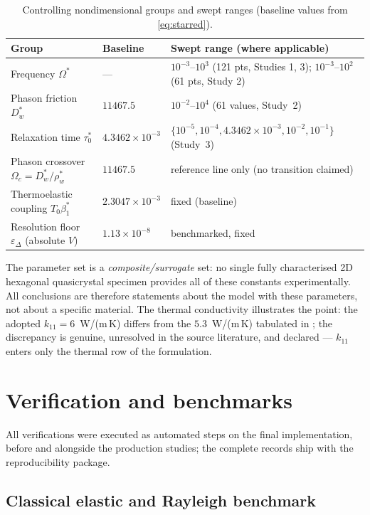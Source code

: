 \documentclass[11pt]{article}
\newcommand{\e}{\varepsilon}
\newcommand{\Om}{\Omega}
\newcommand{\rw}{\rho_w}
\begin{document}
\begin{table}[t]
\centering
\caption{Controlling nondimensional groups and swept ranges (baseline values from \eqref{eq:starred}).}
\label{tab:nondim}
\small
\begin{tabular}{@{}llp{6.05cm}@{}}
\toprule
Group & Baseline & Swept range (where applicable) \\
\midrule
Frequency $\Om^*$ & --- & $10^{-3}$--$10^{3}$ (121 pts, Studies 1, 3); $10^{-3}$--$10^{2}$ (61 pts, Study 2) \\
Phason friction $D_w^*$ & $11467.5$ & $10^{-2}$--$10^{4}$ (61 values, Study~2) \\
Relaxation time $\tau_0^*$ & $4.3462\times10^{-3}$ & $\{10^{-5},10^{-4},4.3462\times10^{-3},10^{-2},10^{-1}\}$ (Study~3) \\
Phason crossover $\Om_c=D_w^*/\rw^*$ & $11467.5$ & reference line only (no transition claimed) \\
Thermoelastic coupling $T_0\beta_1^*$ & $2.3047\times10^{-3}$ & fixed (baseline) \\
Resolution floor $\e_\Delta$ (absolute $V$) & $1.13\times10^{-8}$ & benchmarked, fixed \\
\bottomrule
\end{tabular}
\end{table}

The parameter set is a \emph{composite/surrogate} set: no single fully characterised 2D hexagonal quasicrystal specimen provides all of these constants experimentally. All conclusions are therefore statements about the model with these parameters, not about a specific material. The thermal conductivity illustrates the point: the adopted $k_{11}=6$~W/(m\,K) differs from the $5.3$~W/(m\,K) tabulated in \cite{li2017}; the discrepancy is genuine, unresolved in the source literature, and declared --- $k_{11}$ enters only the thermal row of the formulation.

\section{Verification and benchmarks}

All verifications were executed as automated steps on the final implementation, before and alongside the production studies; the complete records ship with the reproducibility package.

\subsection{Classical elastic and Rayleigh benchmark}
\end{document}
